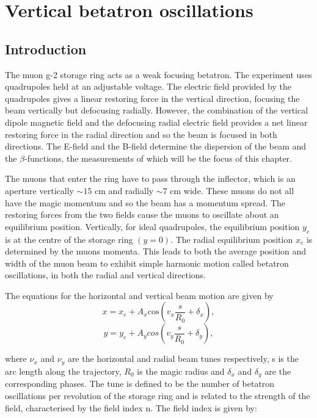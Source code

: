 
\chapter{Vertical betatron oscillations} %
\label{Chapter6} %

\section{Introduction}

The muon g-2 storage ring acts as a weak focusing betatron. The experiment uses quadrupoles held at an adjustable voltage. The electric field provided by the quadrupoles gives a linear restoring force in the vertical direction, focusing the beam vertically but defocusing radially. However, the combination of the vertical dipole magnetic field and the defocusing radial electric field provides a net linear restoring force in the radial direction and so the beam is focused in both directions. The E-field and the B-field determine the dispersion of the beam and the $\beta$-functions, the measurements of which will be the focus of this chapter.

The muons that enter the ring have to pass through the inflector, which is an aperture vertically $\sim{15}$ cm and radially $\sim{7}$ cm wide. These muons do not all have the magic momentum and so the beam has a momentum spread. The restoring forces from the two fields cause the muons to oscillate about an equilibrium position. Vertically, for ideal quadrupoles, the equilibrium position $y_{e}$ is at the centre of the storage ring $(y = 0)$. The radial equilibrium position $x_{e}$ is determined by the muons momenta. This leads to both the average position and width of the muon beam to exhibit simple harmonic motion called betatron oscillations, in both the radial and vertical directions. 

The equations for the horizontal and vertical beam motion are given by 
\begin{equation}
x = x_{e} + A_{x}\mathrm{cos}(v_{x}\frac{s}{R_{0}} + \delta_{x}),
\end{equation}
\begin{equation}
y = y_{e} + A_{y}cos(v_{y}\frac{s}{R_{0}} + \delta_{y}),
\end{equation}

\noindent
where $\nu_{x}$ and $\nu_{y}$ are the horizontal and radial beam tunes respectively, s is the arc length along the trajectory, $R_{0}$ is the magic radius and $\delta_{x}$ and $\delta_{y}$ are the corresponding phases. The tune is defined to be the number of betatron oscillations per revolution of the storage ring and is related to the strength of the field, characterised by the field index n. The field index is given by:

